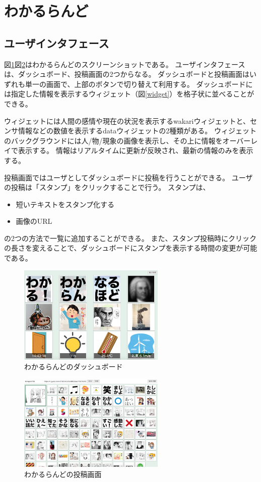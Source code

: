 \section{わかるらんど}

\subsection{ユーザインタフェース}

図\ref{dashboard}図\ref{console}はわかるらんどのスクリーンショットである。
ユーザインタフェースは、ダッシュボード、投稿画面の2つからなる。
ダッシュボードと投稿画面はいずれも単一の画面で、上部のボタンで切り替えて利用する。
ダッシュボードには指定した情報を表示するウィジェット（図\ref{widget}）を格子状に並べることができる。

ウィジェットには人間の感情や現在の状況を表示するwakariウィジェットと、センサ情報などの数値を表示するdataウィジェットの2種類がある。
ウィジェットのバックグラウンドには人/物/現象の画像を表示し、その上に情報をオーバーレイで表示する。
情報はリアルタイムに更新が反映され、最新の情報のみを表示する。

投稿画面ではユーザとしてダッシュボードに投稿を行うことができる。
ユーザの投稿は「スタンプ」をクリックすることで行う。
スタンプは、
\begin{itemize}
\item 短いテキストをスタンプ化する
\item 画像のURL
\end{itemize}
の2つの方法で一覧に追加することができる。
また、スタンプ投稿時にクリックの長さを変えることで、ダッシュボードにスタンプを表示する時間の変更が可能である。

\begin{figure}[h]
\centering
\includegraphics[width=7cm]{images/dashboard.eps}
\caption{わかるらんどのダッシュボード}
\label{dashboard}
\end{figure}

\begin{figure}[h]
\centering
\includegraphics[width=7cm]{images/console.eps}
\caption{わかるらんどの投稿画面}
\label{console}
\end{figure}

